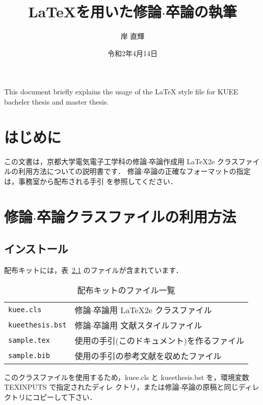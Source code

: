 \documentclass[sotsuron]{kuee}
\title{\LaTeX を用いた修論$\cdot$卒論の執筆}
\author{岸 直輝}
\date{令和2年4月14日}
\begin{document}
\maketitle			%
\begin{eabstract}		%
  This document briefly explains the usage of the \LaTeX{} style file
  for KUEE bacheler thesis and master thesis.
\end{eabstract}
\tableofcontents		%

\chapter{はじめに}
\label{chap:intro}

この文書は，京都大学電気電子工学科の修論$\cdot$卒論作成用 \LaTeX2e{}
クラスファイルの利用方法についての説明書です．
%
修論$\cdot$卒論の正確なフォーマットの指定は，事務室から配布される手引
を参照してください．


\chapter{修論$\cdot$卒論クラスファイルの利用方法}
\label{chap:usage}

\section{インストール}

配布キットには，表~\ref{tab:kit} のファイルが含まれています．
\begin{table}
  \caption{配布キットのファイル一覧}\label{tab:kit}
  \begin{center}
    \begin{tabular}{ll}
      \verb+kuee.cls+ & 修論$\cdot$卒論用 \LaTeX2e{} クラスファイル       \\
      \verb+kueethesis.bst+ & 修論$\cdot$卒論用 \JBibTeX{} 文献スタイルファイル \\
      \verb+sample.tex+ & 使用の手引(このドキュメント)を作るファイル        \\
      \verb+sample.bib+ & 使用の手引の参考文献を収めたファイル              \\
    \end{tabular}
  \end{center}
\end{table}

このクラスファイルを使用するため，{\ttfamily kuee.cls} と {\ttfamily
kueethesis.bst} を，環境変数 {\ttfamily TEXINPUTS} で指定されたディレ
クトリ，または修論$\cdot$卒論の原稿と同じディレクトリにコピーして下さい．
\end{document}
